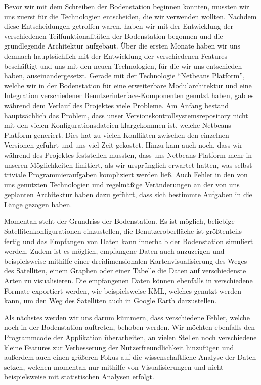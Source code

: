 Bevor wir mit dem Schreiben der Bodenstation beginnen konnten, mussten wir uns zuerst für die Technologien entscheiden, die wir verwenden wollten. Nachdem diese Entscheidungen getroffen waren, haben wir mit der Entwicklung der verschiedenen Teilfunktionalitäten der Bodenstation begonnen und die grundlegende Architektur aufgebaut. Über die ersten Monate haben wir uns demnach hauptsächlich mit der Entwicklung der verschiedenen Features beschäftigt und uns mit den neuen Technologien, für die wir uns entschieden haben, auseinandergesetzt. Gerade mit der Technologie ``Netbeans Platform'', welche wir in der Bodenstation für eine erweiterbare Modularchitektur und eine Integration verschiedener Benutzerinterface-Komponenten genutzt haben, gab es während dem Verlauf des Projektes viele Probleme. Am Anfang bestand hauptsächlich das Problem, dass unser Versionskontrollsystemsrepository nicht mit den vielen Konfigurationsdateien klargekommen ist, welche Netbeans Platform generiert. Dies hat zu vielen Konflikten zwischen den einzelnen Versionen geführt und uns viel Zeit gekostet. Hinzu kam auch noch, dass wir während des Projektes feststellen mussten, dass uns Netbeans Platform mehr in unseren Möglichkeiten limitiert, als wir ursprünglich erwartet hatten, was selbst triviale Programmieraufgaben kompliziert werden ließ. Auch Fehler in den von uns genutzten Technologien und regelmäßige Veränderungen an der von uns geplanten Architektur haben dazu geführt, dass sich bestimmte Aufgaben in die Länge gezogen haben.

Momentan steht der Grundriss der Bodenstation. Es ist möglich, beliebige Satellitenkonfigurationen einzustellen, die Benutzeroberfläche ist größtenteils fertig und das Empfangen von Daten kann innerhalb der Bodenstation simuliert werden. Zudem ist es möglich, empfangene Daten auch anzuzeigen und beispielsweise mithilfe einer dreidimensionalen Kartenvisualisierung des Weges des Satelliten, einem Graphen oder einer Tabelle die Daten auf verschiedenste Arten zu visualisieren. Die empfangenen Daten können ebenfalls in verschiedene Formate exportiert werden, wie beispielsweise KML, welches genutzt werden kann, um den Weg des Satelliten auch in Google Earth darzustellen.

Als nächstes werden wir uns darum kümmern, dass verschiedene Fehler, welche noch in der Bodenstation auftreten, behoben werden. Wir möchten ebenfalls den Programmcode der Applikation überarbeiten, an vielen Stellen noch verschiedene kleine Features zur Verbesserung der Nutzerfreundlichkeit hinzufügen und außerdem auch einen größeren Fokus auf die wissenschaftliche Analyse der Daten setzen, welchen momentan nur mithilfe von Visualisierungen und nicht beispielsweise mit statistischen Analysen erfolgt.

